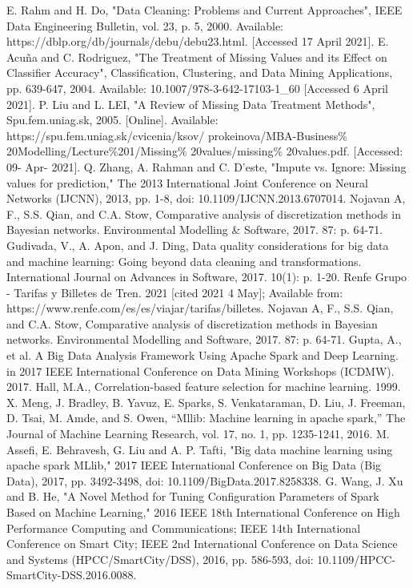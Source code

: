 \documentclass[conference]{IEEEtran}
\begin{document}
\begin{thebibliography}{00}
 E. Rahm and H. Do, "Data Cleaning: Problems and Current Approaches", IEEE Data Engineering Bulletin, vol. 23, p. 5, 2000. Available: https://dblp.org/db/journals/debu/debu23.html. [Accessed 17 April 2021].
 E. Acuña and C. Rodriguez, "The Treatment of Missing Values and its Effect on Classifier Accuracy", Classification, Clustering, and Data Mining Applications, pp. 639-647, 2004. Available: 10.1007/978-3-642-17103-1\_60 [Accessed 6 April 2021].
 P. Liu and L. LEI, "A Review of Missing Data Treatment Methods", Spu.fem.uniag.sk, 2005. [Online]. Available: https://spu.fem.uniag.sk/cvicenia/ksov/ prokeinova/MBA-Business\% 20Modelling/Lecture\%201/Missing\% 20values/missing\% 20values.pdf. [Accessed: 09- Apr- 2021]. 
 Q. Zhang, A. Rahman and C. D'este, "Impute vs. Ignore: Missing values for prediction," The 2013 International Joint Conference on Neural Networks (IJCNN), 2013, pp. 1-8, doi: 10.1109/IJCNN.2013.6707014.
 Nojavan A, F., S.S. Qian, and C.A. Stow, Comparative analysis of discretization methods in Bayesian networks. Environmental Modelling \& Software, 2017. 87: p. 64-71.
 Gudivada, V., A. Apon, and J. Ding, Data quality considerations for big data and machine learning: Going beyond data cleaning and transformations. International Journal on Advances in Software, 2017. 10(1): p. 1-20.
 Renfe Grupo - Tarifas y Billetes de Tren. 2021  [cited 2021 4 May]; Available from: https://www.renfe.com/es/es/viajar/tarifas/billetes.
 Nojavan A, F., S.S. Qian, and C.A. Stow, Comparative analysis of discretization methods in Bayesian networks. Environmental Modelling and Software, 2017. 87: p. 64-71.
 Gupta, A., et al. A Big Data Analysis Framework Using Apache Spark and Deep Learning. in 2017 IEEE International Conference on Data Mining Workshops (ICDMW). 2017.
 Hall, M.A., Correlation-based feature selection for machine learning. 1999.
 X. Meng, J. Bradley, B. Yavuz, E. Sparks, S. Venkataraman, D. Liu, J. Freeman, D. Tsai, M. Amde, and S. Owen, “Mllib: Machine learning in apache spark,” The Journal of Machine Learning Research, vol. 17, no. 1, pp. 1235-1241, 2016.
 M. Assefi, E. Behravesh, G. Liu and A. P. Tafti, "Big data machine learning using apache spark MLlib," 2017 IEEE International Conference on Big Data (Big Data), 2017, pp. 3492-3498, doi: 10.1109/BigData.2017.8258338.
 G. Wang, J. Xu and B. He, "A Novel Method for Tuning Configuration Parameters of Spark Based on Machine Learning," 2016 IEEE 18th International Conference on High Performance Computing and Communications; IEEE 14th International Conference on Smart City; IEEE 2nd International Conference on Data Science and Systems (HPCC/SmartCity/DSS), 2016, pp. 586-593, doi: 10.1109/HPCC-SmartCity-DSS.2016.0088.

\end{thebibliography}
\end{document}
